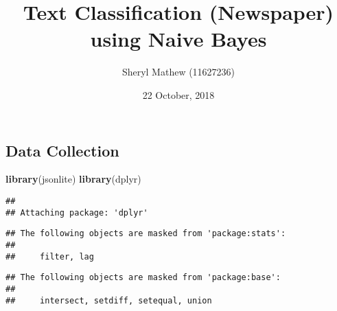 \documentclass[]{article}
\title{Text Classification (Newspaper) using Naive Bayes}
\author{Sheryl Mathew (11627236)}
\date{22 October, 2018}
\newenvironment{Shaded}{\begin{snugshade}}{\end{snugshade}}
\newcommand{\KeywordTok}[1]{\textcolor[rgb]{0.13,0.29,0.53}{\textbf{#1}}}
\newcommand{\NormalTok}[1]{#1}
\begin{document}
\maketitle

\subsection{Data Collection}\label{data-collection}

\begin{Shaded}
\begin{Highlighting}[]
\KeywordTok{library}\NormalTok{(jsonlite)}
\KeywordTok{library}\NormalTok{(dplyr)}
\end{Highlighting}
\end{Shaded}

\begin{verbatim}
## 
## Attaching package: 'dplyr'
\end{verbatim}

\begin{verbatim}
## The following objects are masked from 'package:stats':
## 
##     filter, lag
\end{verbatim}

\begin{verbatim}
## The following objects are masked from 'package:base':
## 
##     intersect, setdiff, setequal, union
\end{verbatim}
\end{document}
